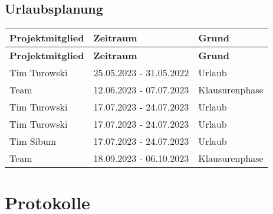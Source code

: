 \subsection{Urlaubsplanung}

\begin{flushleft}
		\begin{longtable}{p{4cm}p{6cm}p{4cm}}
            \toprule
            \textbf{Projektmitglied} & \textbf{Zeitraum} & \textbf{Grund} \\
            \midrule\endfirsthead
            \toprule
            \textbf{Projektmitglied} & \textbf{Zeitraum} & \textbf{Grund} \\
            \midrule\endhead
            	Tim Turowski & 25.05.2023 - 31.05.2022 & Urlaub \\ \midrule
				Team & 12.06.2023 - 07.07.2023 & Klausurenphase \\ \midrule
				Tim Turowski & 17.07.2023 - 24.07.2023 & Urlaub \\  \midrule
				Tim Turowski & 17.07.2023 - 24.07.2023 & Urlaub \\ \midrule
				Tim Sibum & 17.07.2023 - 24.07.2023 & Urlaub \\ \midrule
				Team & 18.09.2023 - 06.10.2023 & Klausurenphase \\ 
            \bottomrule
    \end{longtable}
\end{flushleft}

\section{Protokolle}
